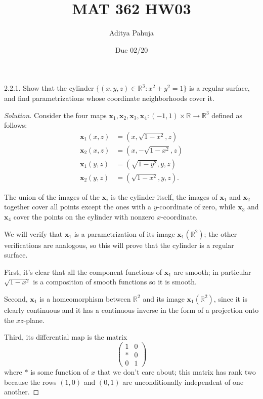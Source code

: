 \documentclass[10pt]{scrartcl}
\title{\vspace{-2em}MAT 362 HW03}
\author{\large Aditya Pahuja}
\date{\large Due 02/20}
\providecommand{\RR}{\mathbb R}
\providecommand{\mb}[1]{\mathbf{#1}}
\newenvironment{soln}{\begin{proof}[Solution]}{\end{proof}}
\begin{document}
\maketitle

\begin{problem*}2.2.1.
	Show that the cylinder $\{(x,y,z)\in\RR^3 : x^2 + y^2 = 1\}$
	is a regular surface, and find parametrizations
	whose coordinate neighborhoods cover it.
\end{problem*}

\begin{soln}
	Consider the four maps $\mb x_1, \mb x_2,\mb x_3,\mb x_4\colon
	(-1,1)\times\RR\to\RR^3$ defined as follows:
	\begin{align*}
		\mb x_1(x,z) &= (x,\sqrt{1-x^2},z)\\
		\mb x_2(x,z) &= (x,-\sqrt{1-x^2},z)\\
		\mb x_1(y,z) &= (\sqrt{1-y^2},y,z)\\
		\mb x_2(y,z) &= (\sqrt{1-x^2},y,z).
	\end{align*}
	
	The union of the images of the $\mb x_i$ is the cylinder itself,
	the images of $\mb x_1$ and $\mb x_2$ together cover all points except
	the ones with a $y$-coordinate of zero, while $\mb x_3$ and $\mb x_4$
	cover the points on the cylinder with nonzero $x$-coordinate.
	
	We will verify that $\mb x_1$ is a parametrization of
	its image $\mb x_1(\RR^2)$; the other verifications are analogous,
	so this will prove that the cylinder is a regular surface.
	
	First, it's clear that all the component functions of $\mb x_1$
	are smooth; in particular $\sqrt{1-x^2}$ is a composition of
	smooth functions so it is smooth.
	
	Second, $\mb x_1$ is a homeomorphism between $\RR^2$
	and its image $\mb x_1(\RR^2)$, since it is clearly continuous
	and it has a continuous inverse
	in the form of a projection onto the $xz$-plane.
	
	Third, its differential map is the matrix
	\[\begin{pmatrix}
		1&0\\
		*&0\\
		0&1
	\end{pmatrix}\]
	where $*$ is some function of $x$ that we don't care about;
	this matrix has rank two because the rows $(1, 0)$ and $(0, 1)$
	are unconditionally independent of one another.
\end{soln}
\end{document}
